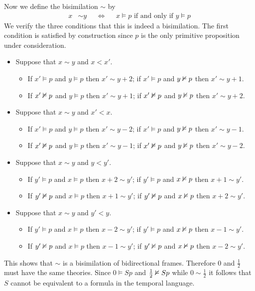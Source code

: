 \documentclass{article}
\begin{document}
\begin{ex}
\begin{enumerate}
Now we define the bisimilation
$\sim$ by
\begin{align*}
x & \sim y & & \Leftrightarrow & & x\models p\text{ if and only if }y\models p
\end{align*}
We verify the three conditions that this is indeed a bisimilation. The first condition is satisfied by construction since $p$ is the only primitive proposition under consideration.
\begin{itemize}
\item Suppose that $x\sim y$ and $x<x'$. 
\begin{itemize}
\item If $x'\models p$ and $y\models p$ then $x'\sim y+2$; if $x'\models p$ and $y\nvDash p$ then $x'\sim y+1$.
\item If $x'\nvDash p$ and $y\models p$ then $x'\sim y+1$; if $x'\nvDash p$ and $y\nvDash p$ then $x'\sim y+2$.
\end{itemize}
\item Suppose that $x\sim y$ and $x'<x$.
\begin{itemize}
\item If $x'\models p$ and $y\models p$ then $x'\sim y-2$; if $x'\models p$ and $y\nvDash p$ then $x'\sim y-1$.
\item If $x'\nvDash p$ and $y\models p$ then $x'\sim y-1$; if $x'\nvDash p$ and $y\nvDash p$ then $x'\sim y-2$.
\end{itemize}
\item Suppose that $x\sim y$ and $y<y'$.
\begin{itemize}
\item If $y'\models p$ and $x\models p$ then $x+2\sim y'$; if $y'\models p$ and $x\nvDash p$ then $x+1\sim y'$.
\item If $y'\nvDash p$ and $x\models p$ then $x+1\sim y'$; if $y'\nvDash p$ and $x\nvDash p$ then $x+2\sim y'$.
\end{itemize}
\item Suppose that $x\sim y$ and $y'<y$.
\begin{itemize}
\item If $y'\models p$ and $x\models p$ then $x-2\sim y'$; if $y'\models p$ and $x\nvDash p$ then $x-1\sim y'$.
\item If $y'\nvDash p$ and $x\models p$ then $x-1\sim y'$; if $y'\nvDash p$ and $x\nvDash p$ then $x-2\sim y'$.
\end{itemize}
\end{itemize}
This shows that $\sim$ is a bisimilation of bidirectional frames. Therefore $0$ and $\frac{1}{2}$ must have the same theories. Since $0\models Sp$ and $\frac{1}{2}\nvDash Sp$ while $0\sim\frac{1}{2}$ it follows that $S$ cannot be equivalent to a formula in the temporal language.
\end{enumerate}
\end{ex}
\end{document}
